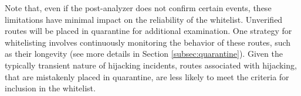 Note that, even if the post-analyzer does not confirm certain events, these limitations have minimal impact on the reliability of the whitelist.
Unverified routes will be placed in quarantine for additional examination.
One strategy for whitelisting involves continuously monitoring the behavior of these routes, such as their longevity (see more details in Section \ref{subsec:quarantine}).
Given the typically transient nature of hijacking incidents, routes associated with hijacking, that are mistakenly placed in quarantine, are less likely to meet the criteria for inclusion in the whitelist. 
